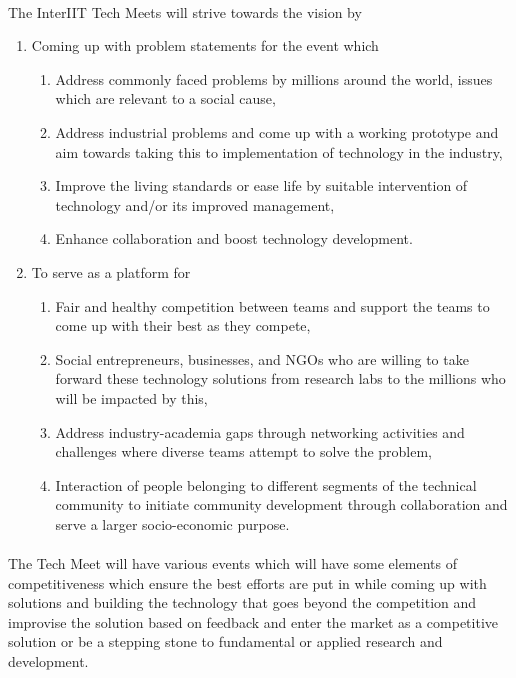 \paragraph{}
The InterIIT Tech Meets will strive towards the vision by
\begin{enumerate}
    \item Coming up with problem statements for the event which
    \begin{enumerate}
        \item Address commonly faced problems by millions around the world, issues which are relevant to a social cause,
        \item Address industrial problems and come up with a working prototype and aim towards taking this to implementation of technology in the industry,
        \item Improve the living standards or ease life by suitable intervention of technology and/or its improved management,
        \item Enhance collaboration and boost technology development.
    \end{enumerate}
    \item To serve as a platform for
    \begin{enumerate}
        \item Fair and healthy competition between teams and support the teams to come up with their best as they compete,
        \item Social entrepreneurs, businesses, and NGOs who are willing to take forward these technology solutions from research labs to the millions who will be impacted by this,
        \item Address industry-academia gaps through networking activities and challenges where diverse teams attempt to solve the problem,
        \item Interaction of people belonging to different segments of the technical community to initiate community development through collaboration and serve a larger socio-economic purpose.
    \end{enumerate}
\end{enumerate}

\paragraph{}
The Tech Meet will have various events which will have some elements of competitiveness which ensure the best efforts are put in while coming up with solutions and building the technology that goes beyond the competition and improvise the solution based on feedback and enter the market as a competitive solution or be a stepping stone to fundamental or applied research and development.